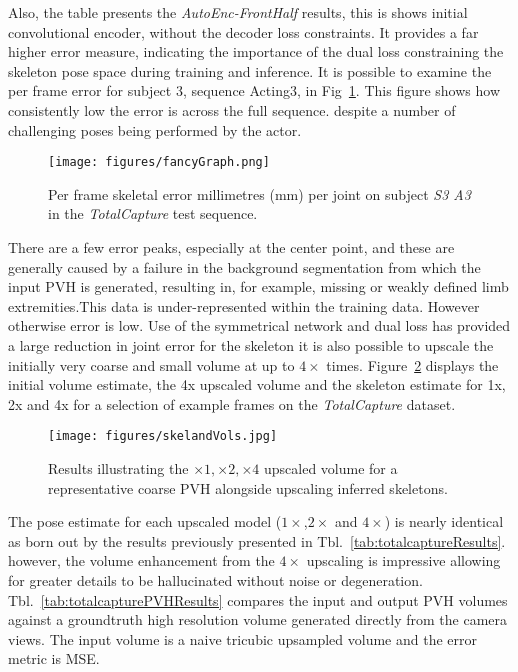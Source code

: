 \documentclass[runningheads]{llncs}
\begin{document}
Also, the table presents the \emph{AutoEnc-FrontHalf} results, this is shows initial convolutional encoder, without the decoder loss constraints. It provides a far higher error measure, indicating the importance of the dual loss constraining the skeleton pose space during training and inference. It is possible to examine the per frame error for subject 3, sequence Acting3, in Fig~\ref{fig:TotalcaptureFramebyFrame}. This figure shows how consistently low the error is across the full sequence. despite a number of challenging poses being performed by the actor.
\begin{figure}[htb]
\centering
\texttt{[image: figures/fancyGraph.png]}
\caption{Per frame skeletal error millimetres (mm) per joint on subject {\em S3 A3} in the {\em TotalCapture} test sequence.}
\label{fig:TotalcaptureFramebyFrame}
\end{figure}
There are a few error peaks, especially at the center point, and these are generally caused by a failure in the background segmentation from which the input PVH is generated, resulting in, for example, missing or weakly defined limb extremities.This data is under-represented within the training data. However otherwise error is low. Use of the symmetrical network and dual loss has provided a large reduction in joint error for the skeleton it is also possible to upscale the initially very coarse and small volume at up to $4 \times$ times. Figure~\ref{fig:TCexampleAllSkels} displays the initial volume estimate, the 4x upscaled volume and the skeleton estimate for 1x, 2x and 4x for a selection of example frames on the {\em TotalCapture} dataset.
\begin{figure}[htb]
\centering
\texttt{[image: figures/skelandVols.jpg]}
\caption{Results illustrating the $\times 1, \times 2, \times 4$ upscaled volume for a representative coarse PVH alongside  upscaling inferred  skeletons.}
\label{fig:TCexampleAllSkels}
\squeezeup
\end{figure}
The pose estimate for each upscaled model ($1 \times$,$2 \times$ and $4 \times$) is nearly identical as born out by the results previously presented in Tbl.~\ref{tab:totalcaptureResults}. however, the volume enhancement from the $4 \times$ upscaling is impressive allowing for greater details to be hallucinated without noise or degeneration. Tbl.~\ref{tab:totalcapturePVHResults} compares the input and output PVH volumes against a groundtruth high resolution volume generated directly from the camera views. The input volume is a naive tricubic upsampled volume and the error metric is MSE.
\end{document}
